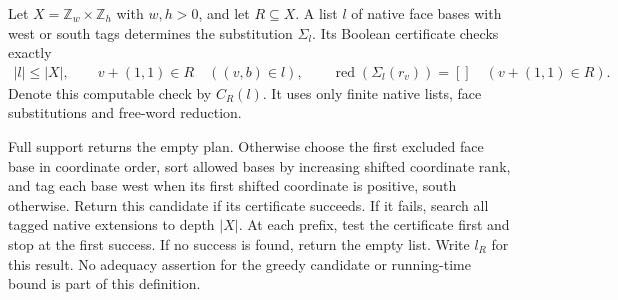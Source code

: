 \begin{definition}
    \label{def:peps_dual_computed_face_plan}
    \leanok
    Let $X=\mathbb Z_w\times\mathbb Z_h$ with $w,h>0$, and let $R\subseteq X$.
    A list $l$ of native face bases with west or south tags determines
    the substitution $\Sigma_l$. Its Boolean certificate checks exactly
    \begin{align}
        |l|\le |X|,\qquad
        v+(1,1)\in R\quad((v,b)\in l),\qquad
        \operatorname{red}(\Sigma_l(r_v))=[]
        \quad(v+(1,1)\in R).
        \label{eq:peps_dual_computed_face_certificate}
    \end{align}
    Denote this computable check by $C_R(l)$. It uses only finite native
    lists, face substitutions and free-word reduction.

    Full support returns the empty plan. Otherwise choose the first excluded
    face base in coordinate order, sort allowed bases by increasing shifted
    coordinate rank, and tag each base west when its first shifted coordinate
    is positive, south otherwise. Return this candidate if its certificate
    succeeds. If it fails, search all tagged native extensions to depth $|X|$.
    At each prefix, test the certificate first and stop at the first success.
    If no success is found, return the empty list. Write $l_R$ for this result.
    No adequacy assertion for the greedy candidate or running-time bound
    is part of this definition.
\end{definition}

